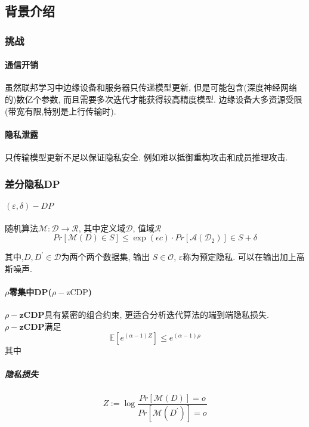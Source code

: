 \subsection{背景介绍}

\subsubsection{挑战}

\paragraph{通信开销}
虽然联邦学习中边缘设备和服务器只传递模型更新, 但是可能包含(深度神经网络的)数亿个参数, 而且需要多次迭代才能获得较高精度模型. 边缘设备大多资源受限(带宽有限,特别是上行传输时).
\paragraph{隐私泄露}
只传输模型更新不足以保证隐私安全. 例如难以抵御重构攻击和成员推理攻击.


\subsubsection{差分隐私DP}
\paragraph{$(\varepsilon,\delta)-DP$} 
随机算法$\mathcal{M:D \to R}$, 其中定义域$\mathcal{D}$, 值域$\mathcal{R}$
\begin{equation}
    Pr [ \mathcal{M}(D) \in S ] \leqslant \exp(\epsilon c) \cdot Pr [ \mathcal{A(D_2)} ] \in S  + \delta 
\end{equation}

其中,$D, D^{'} \in \mathcal{D}$为两个两个数据集, 输出 $S \in \mathcal{O}$, $\varepsilon$称为预定隐私.
可以在输出加上高斯噪声.

\paragraph{$\rho$零集中DP($\rho-\text{zCDP}$)}
$\rho-\textbf{zCDP}$具有紧密的组合约束, 更适合分析迭代算法的端到端隐私损失. 
$\rho-\textbf{zCDP}$满足
\begin{equation}
    \mathbb{E}[e^{(\alpha-1)Z}] \leqslant e^{(\alpha -1)\rho}
\end{equation} 
其中\subparagraph{隐私损失} 
\begin{equation}
    Z := \log \frac{Pr[\mathcal{M}(D)]=o}{Pr[\mathcal{M}(D^{'})]=o} 
\end{equation}

